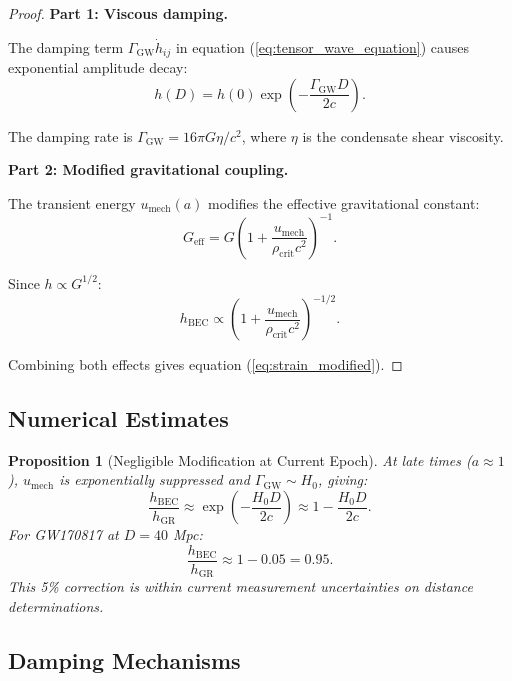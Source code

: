 \documentclass[11pt,a4paper]{article}
\newcommand{\rhocrit}{\ensuremath{\rho_{\mathrm{crit}}}}
\newcommand{\umech}{\ensuremath{u_{\mathrm{mech}}}}
\newtheorem{proposition}[theorem]{Proposition}
\theoremstyle{definition}
\theoremstyle{remark}
\begin{document}
\begin{proof}
\textbf{Part 1: Viscous damping.}

The damping term $\Gamma_{\mathrm{GW}}\dot{h}_{ij}$ in equation (\ref{eq:tensor_wave_equation}) causes exponential amplitude decay:
\begin{equation}
h(D) = h(0)\exp\left(-\frac{\Gamma_{\mathrm{GW}} D}{2c}\right).
\end{equation}

The damping rate is $\Gamma_{\mathrm{GW}} = 16\pi G\eta/c^2$, where $\eta$ is the condensate shear viscosity.

\textbf{Part 2: Modified gravitational coupling.}

The transient energy $\umech(a)$ modifies the effective gravitational constant:
\begin{equation}
G_{\mathrm{eff}} = G\left(1 + \frac{\umech}{\rhocrit c^2}\right)^{-1}.
\end{equation}

Since $h \propto G^{1/2}$:
\begin{equation}
h_{\mathrm{BEC}} \propto \left(1 + \frac{\umech}{\rhocrit c^2}\right)^{-1/2}.
\end{equation}

Combining both effects gives equation (\ref{eq:strain_modified}).
\end{proof}

\subsection{Numerical Estimates}
\label{sec:strain_numerics}

\begin{proposition}[Negligible Modification at Current Epoch]
At late times ($a \approx 1$), $\umech$ is exponentially suppressed and $\Gamma_{\mathrm{GW}} \sim H_0$, giving:
\begin{equation}
\frac{h_{\mathrm{BEC}}}{h_{\mathrm{GR}}} \approx \exp\left(-\frac{H_0 D}{2c}\right) \approx 1 - \frac{H_0 D}{2c}.
\end{equation}
For GW170817 at $D = 40$ Mpc:
\begin{equation}
\frac{h_{\mathrm{BEC}}}{h_{\mathrm{GR}}} \approx 1 - 0.05 = 0.95.
\end{equation}
This 5\% correction is within current measurement uncertainties on distance determinations.
\end{proposition}

\subsection{Damping Mechanisms}
\label{sec:damping}
\end{document}
